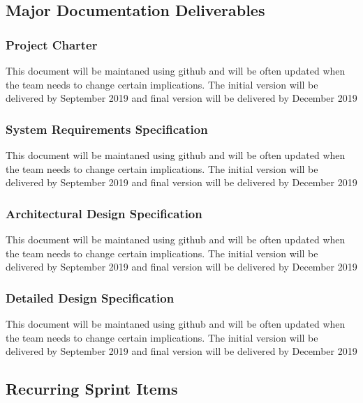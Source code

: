
\subsection{Major Documentation Deliverables}

\subsubsection{Project Charter}
This document will be maintaned using github and will be often updated when the team needs to change certain implications. The initial version will be delivered by September 2019 and final version will be delivered by December 2019

\subsubsection{System Requirements Specification}
This document will be maintaned using github and will be often updated when the team needs to change certain implications. The initial version will be delivered by September 2019 and final version will be delivered by December 2019

\subsubsection{Architectural Design Specification}
This document will be maintaned using github and will be often updated when the team needs to change certain implications. The initial version will be delivered by September 2019 and final version will be delivered by December 2019

\subsubsection{Detailed Design Specification}
This document will be maintaned using github and will be often updated when the team needs to change certain implications. The initial version will be delivered by September 2019 and final version will be delivered by December 2019

\subsection{Recurring Sprint Items}


